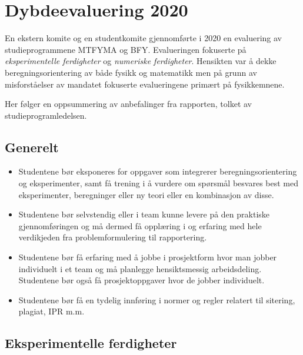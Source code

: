 \section{Dybdeevaluering 2020}

En ekstern komite og en studentkomite gjennomførte i 2020 en evaluering av studieprogrammene MTFYMA og BFY. Evalueringen fokuserte på \emph{eksperimentelle ferdigheter} og \emph{numeriske ferdigheter}. Hensikten var å dekke beregningsorientering av både fysikk og matematikk men på grunn av misforståelser av mandatet fokuserte evalueringene primært på fysikkemnene.

Her følger en oppsummering av anbefalinger fra rapporten, tolket av studieprogramledelsen.

\subsection{Generelt}

\begin{itemize}
	\item Studentene bør eksponeres for oppgaver som integrerer beregningsorientering og eksperimenter, samt få trening i å vurdere om spørsmål besvares best med eksperimenter, beregninger eller ny teori eller en kombinasjon av disse.
	\item Studentene bør selvstendig eller i team kunne levere på den praktiske gjennomføringen og må dermed få opplæring i og erfaring med hele verdikjeden fra problemformulering til rapportering.
	\item Studentene bør få erfaring med å jobbe i prosjektform hvor man jobber individuelt i et team og må planlegge hensiktsmessig arbeidsdeling. Studentene bør også få prosjektoppgaver hvor de jobber individuelt.
	\item Studentene bør få en tydelig innføring i normer og regler relatert til sitering, plagiat, IPR m.m.
\end{itemize}

\subsection{Eksperimentelle ferdigheter}

